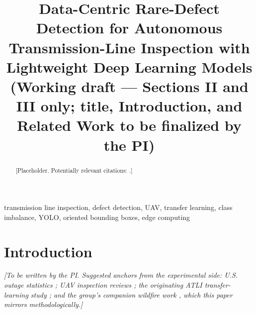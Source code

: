 \documentclass[conference]{IEEEtran}
\begin{document}
\title{Data-Centric Rare-Defect Detection for Autonomous Transmission-Line Inspection with Lightweight Deep Learning Models\\
{\footnotesize (Working draft --- Sections II and III only; title, Introduction, and Related Work to be finalized by the PI)}}

\author{
}

\maketitle

\begin{abstract}
[Placeholder. Potentially relevant citations: \cite{tsai2025atli,jocher2023ultralytics,zhang2023dino,vazquez2024wildfire,vazquez2026wildfire,zhang2018mixup}.]
\end{abstract}

\begin{IEEEkeywords}
transmission line inspection, defect detection, UAV, transfer learning, class imbalance, YOLO, oriented bounding boxes, edge computing
\end{IEEEkeywords}

\section{Introduction}
\textit{[To be written by the PI. Suggested anchors from the experimental side: U.S. outage statistics \cite{do2023outages}; UAV inspection reviews \cite{nguyen2018autonomous,liu2020review,yang2020powerline,faisal2025powerline}; the originating ATLI transfer-learning study \cite{tsai2025atli}; and the group's companion wildfire work \cite{vazquez2024wildfire,vazquez2026wildfire}, which this paper mirrors methodologically.]}
\end{document}
